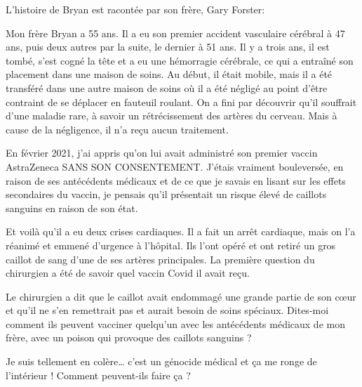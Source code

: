 L'histoire de Bryan est racontée par son frère, Gary Forster:

Mon frère Bryan a 55 ans. Il a eu son premier accident vasculaire cérébral à 47
ans, puis deux autres par la suite, le dernier à 51 ans. Il y a trois ans, il
est tombé, s'est cogné la tête et a eu une hémorragie cérébrale, ce qui a
entraîné son placement dans une maison de soins. Au début, il était mobile, mais
il a été transféré dans une autre maison de soins où il a été négligé au point
d'être contraint de se déplacer en fauteuil roulant. On a fini par découvrir
qu'il souffrait d'une maladie rare, à savoir un rétrécissement des artères du
cerveau. Mais à cause de la négligence, il n'a reçu aucun traitement.

En février 2021, j'ai appris qu'on lui avait administré son premier vaccin
AstraZeneca SANS SON CONSENTEMENT. J'étais vraiment bouleversée, en raison de
ses antécédents médicaux et de ce que je savais en lisant sur les effets
secondaires du vaccin, je pensais qu'il présentait un risque élevé de caillots
sanguins en raison de son état.

Et voilà qu'il a eu deux crises cardiaques. Il a fait un arrêt cardiaque, mais
on l'a réanimé et emmené d'urgence à l'hôpital. Ils l'ont opéré et ont retiré un
gros caillot de sang d'une de ses artères principales. La première question du
chirurgien a été de savoir quel vaccin Covid il avait reçu.

Le chirurgien a dit que le caillot avait endommagé une grande partie de son cœur
et qu'il ne s'en remettrait pas et aurait besoin de soins spéciaux. Dites-moi
comment ils peuvent vacciner quelqu'un avec les antécédents médicaux de mon
frère, avec un poison qui provoque des caillots sanguins ?

Je suis tellement en colère… c'est un génocide médical et ça me ronge de
l'intérieur ! Comment peuvent-ils faire ça ?


